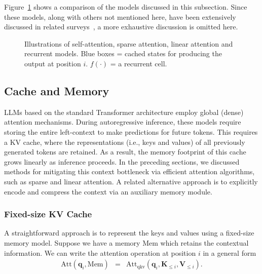 Figure~\ref{fig:comparison-of-efficient-llm-architectures} shows a comparison of the models discussed in this subsection. Since these models, along with others not mentioned here, have been extensively discussed in related surveys~\cite{Tay-etal:2020efficient,xiao-and-zhu:2023introduction}, a more exhaustive discussion is omitted here.

\begin{figure}[!t]
\centering

\caption{Illustrations of self-attention, sparse attention, linear attention and recurrent models. Blue boxes = cached states for producing the output at position $i$. $f(\cdot)$ = a recurrent cell.}
\label{fig:comparison-of-efficient-llm-architectures}
\end{figure}

\subsection{Cache and Memory}
\label{sec:long-context-cache-and-memory}

\noindent LLMs based on the standard Transformer architecture employ global (dense) attention mechanisms. During autoregressive inference, these models require storing the entire left-context to make predictions for future tokens. This requires a KV cache, where the representations (i.e., keys and values) of all previously generated tokens are retained. As a result, the memory footprint of this cache grows linearly as inference proceeds. In the preceding sections, we discussed methods for mitigating this context bottleneck via efficient attention algorithms, such as sparse and linear attention. A related alternative approach is to explicitly encode and compress the context via an auxiliary memory module.

\subsubsection{Fixed-size KV Cache}

A straightforward approach is to represent the keys and values using a fixed-size memory model. Suppose we have a memory $\mathrm{Mem}$ which retains the contextual information. We can write the attention operation at position $i$ in a general form
\begin{eqnarray}
\mathrm{Att}(\mathbf{q}_i,\mathrm{Mem}) & = & \mathrm{Att}_{\mathrm{qkv}}(\mathbf{q}_i,\mathbf{K}_{\le i},\mathbf{V}_{\le i}).
\end{eqnarray}

